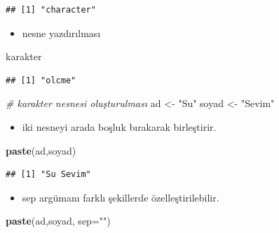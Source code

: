 \documentclass[
  oneside]{book}
\newenvironment{Shaded}{\begin{snugshade}}{\end{snugshade}}
\newcommand{\AttributeTok}[1]{\textcolor[rgb]{0.13,0.29,0.53}{#1}}
\newcommand{\CommentTok}[1]{\textcolor[rgb]{0.56,0.35,0.01}{\textit{#1}}}
\newcommand{\FunctionTok}[1]{\textcolor[rgb]{0.13,0.29,0.53}{\textbf{#1}}}
\newcommand{\NormalTok}[1]{#1}
\newcommand{\OtherTok}[1]{\textcolor[rgb]{0.56,0.35,0.01}{#1}}
\newcommand{\StringTok}[1]{\textcolor[rgb]{0.31,0.60,0.02}{#1}}
\providecommand{\tightlist}{%
  \setlength{\itemsep}{0pt}\setlength{\parskip}{0pt}}
\begin{document}
\begin{verbatim}
## [1] "character"
\end{verbatim}

\begin{itemize}
\tightlist
\item
  nesne yazdırılması
\end{itemize}

\begin{Shaded}
\begin{Highlighting}[]
\NormalTok{karakter}
\end{Highlighting}
\end{Shaded}

\begin{verbatim}
## [1] "olcme"
\end{verbatim}

\begin{Shaded}
\begin{Highlighting}[]
\CommentTok{\# karakter nesnesi oluşturulması}
\NormalTok{ad }\OtherTok{\textless{}{-}} \StringTok{"Su"}
\NormalTok{soyad }\OtherTok{\textless{}{-}} \StringTok{"Sevim"}
\end{Highlighting}
\end{Shaded}

\begin{itemize}
\tightlist
\item
  iki nesneyi arada boşluk bırakarak birleştirir.
\end{itemize}

\begin{Shaded}
\begin{Highlighting}[]
\FunctionTok{paste}\NormalTok{(ad,soyad)}
\end{Highlighting}
\end{Shaded}

\begin{verbatim}
## [1] "Su Sevim"
\end{verbatim}

\begin{itemize}
\tightlist
\item
  sep argümanı farklı şekillerde özelleştirilebilir.
\end{itemize}

\begin{Shaded}
\begin{Highlighting}[]
\FunctionTok{paste}\NormalTok{(ad,soyad, }\AttributeTok{sep=}\StringTok{""}\NormalTok{)}
\end{Highlighting}
\end{Shaded}
\end{document}
